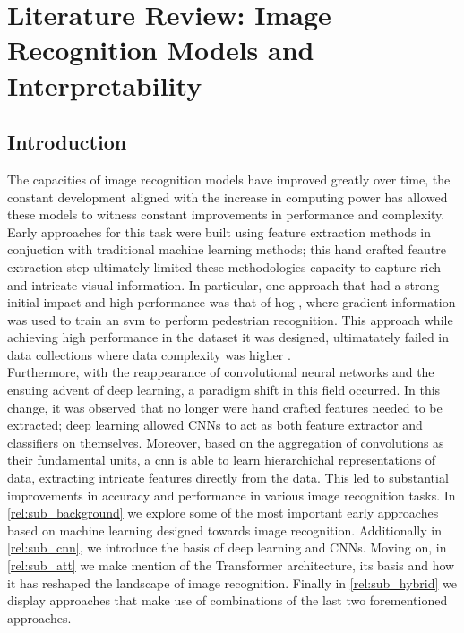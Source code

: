 \chapter{Literature Review: Image Recognition Models and Interpretability}
\label{ch:rel}
\chaptertoc{}
\section{Introduction}
The capacities of image recognition models have improved greatly over time, the constant 
development aligned with the increase in computing power has allowed these models to witness 
constant improvements in performance and complexity. Early approaches for this task were built 
using feature extraction methods in conjuction with traditional machine learning methods;
this hand crafted feautre extraction step ultimately limited these methodologies capacity to 
capture rich and intricate visual information. In particular, one approach that had a strong 
initial impact and high performance was that of \gls{hog} \autocite{dalal2005histograms}, 
where gradient information was used to train an \gls{svm} to perform pedestrian recognition. 
This approach while achieving high performance in the dataset it was designed, ultimatately 
failed in data collections where data complexity was higher \autocite{5975165}.\\
Furthermore, with the reappearance of convolutional neural networks and the ensuing advent of 
deep learning, a paradigm shift in this field occurred. In this change, it was observed that 
no longer were hand crafted features needed to be extracted; deep learning allowed CNNs to act 
as both feature extractor and classifiers on themselves. Moreover, based on the aggregation of 
convolutions as their fundamental units, a \gls{cnn} is able to learn hierarchichal 
representations of data, extracting intricate features directly from the data. 
This led to substantial improvements in accuracy and performance in various image recognition 
tasks. In \autoref{rel:sub_background} we explore some of the most important early approaches based 
on machine learning designed towards image recognition. Additionally in \autoref{rel:sub_cnn}, we 
introduce the basis of deep learning and CNNs. Moving on, in \autoref{rel:sub_att} we make mention 
of the Transformer architecture, its basis and how it has reshaped the landscape of image 
recognition. Finally in \autoref{rel:sub_hybrid} we display approaches that make use of combinations 
of the last two forementioned approaches.

